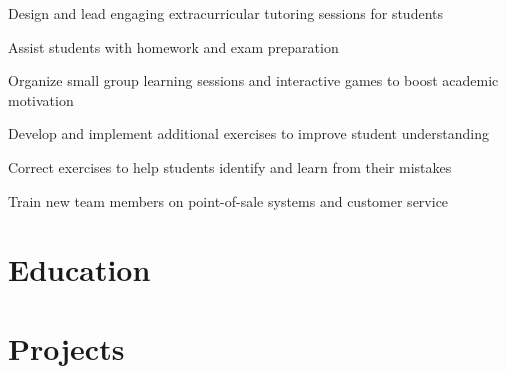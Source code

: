 \documentclass[letterpaper,10pt]{article}
\begin{document}
  \begin{resume_list}
    \item Design and lead engaging extracurricular tutoring sessions for students
    \item Assist students with homework and exam preparation
    \item Organize small group learning sessions and interactive games to boost academic motivation
    \item Develop and implement additional exercises to improve student understanding
    \item Correct exercises to help students identify and learn from their mistakes
  \end{resume_list}

  \begin{resume_list}
    \item Train new team members on point-of-sale systems and customer service
  \end{resume_list}


  \section{Education}

  \vspace{10pt}
  \pagebreak


  \section{Projects}
\end{document}
